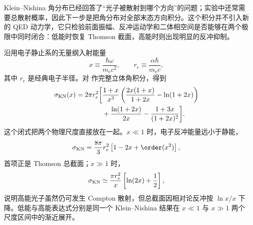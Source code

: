 
Klein--Nishina 角分布已经回答了“光子被散射到哪个方向”的问题；实验中还常需要总散射概率，因此下一步是把角分布对全部末态方向积分。这个积分并不引入新的 QED 动力学，它只检验前面振幅、反冲运动学和二体相空间是否能够在两个极限中同时闭合：低能时恢复 Thomson 截面，高能时则出现明显的反冲抑制。

沿用电子静止系的无量纲入射能量
\begin{equation*}
 x\equiv\frac{\hbar\omega}{m_{\mathrm e} c^2},
 \qquad
 r_e\equiv\frac{\alpha\hbar}{m_{\mathrm e} c},
\end{equation*}
其中 $r_e$ 是经典电子半径。对 作完整立体角积分，得到
\begin{equation}
 {
 \begin{aligned}
 \sigma_{\rm KN}(x)=2\pi r_e^2\bigg[&
 \frac{1+x}{x^3}
 \left(
 \frac{2x(1+x)}{1+2x}-\ln(1+2x)
 \right)\\
 &+\frac{\ln(1+2x)}{2x}
 -\frac{1+3x}{(1+2x)^2}
 \bigg].
 \end{aligned}}
 \label{eq:KN-total-r6}
\end{equation}
这个闭式把两个物理尺度直接放在一起。$x\ll1$ 时，电子反冲能量远小于静能，
\begin{equation}
 \sigma_{\rm KN}
 =\frac{8\pi}{3}r_e^2
 \left[1-2x+\order(x^2)\right],
 \label{eq:KN-low-energy-dp49}
\end{equation}
首项正是 Thomson 总截面；$x\gg1$ 时，
\begin{equation}
 \sigma_{\rm KN}
 \simeq
 \frac{\pi r_e^2}{x}
 \left[\ln(2x)+\frac12\right],
 \label{eq:KN-high-energy-dp49}
\end{equation}
说明高能光子虽然仍可发生 Compton 散射，但总截面因相对论反冲按 $\ln x/x$ 下降。低能与高能表达式分别是同一个 Klein--Nishina 结果在 $x\ll1$ 与 $x\gg1$ 两个尺度区间中的渐近展开。

